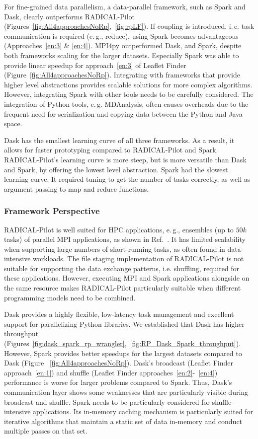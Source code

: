 For fine-grained data parallelism, a data-parallel framework, such as Spark and Dask, clearly outperforms RADICAL-Pilot (Figures~\ref{fig:All4approachesNoRp},~\ref{fig:rpLF}).
If coupling is introduced, i.\,e. task communication is required (e.\,g., reduce), using Spark becomes advantageous (Approaches~\ref{en:3} \& \ref{en:4}). 
MPI4py outperformed Dask, and Spark, despite both frameworks scaling for the larger datasets.
Especially Spark was able to provide linear speedup for approach~\ref{en:3} of Leaflet Finder (Figure~\ref{fig:All4approachesNoRp}).
Integrating with frameworks that provide higher level abstractions provides scalable solutions for more complex algorithms.
However, integrating Spark with other tools needs to be carefully considered.
The integration of Python tools, e.\,g. MDAnalysis, often causes overheads due to the frequent need for serialization and copying data between the Python and Java space.

Dask has the smallest learning curve of all three frameworks.
As a result, it allows for faster prototyping compared to RADICAL-Pilot and Spark.
RADICAL-Pilot's learning curve is more steep, but is more versatile than Dask and Spark, by offering the lowest level abstraction. 
Spark had the slowest learning curve.
It required tuning to get the number of tasks correctly, as well as argument passing to map and reduce functions.

\subsubsection*{Framework Perspective}
RADICAL-Pilot is well suited for HPC applications, e.\,g., ensembles (up to $50k$ tasks) of parallel MPI applications, as shown in Ref.~\cite{merzky2018design,merzky2019using}.
It has limited scalability when supporting large numbers of short-running tasks, as often found in data-intensive workloads.
The file staging implementation of RADICAL-Pilot is not suitable for supporting the data exchange patterns, i.e. shuffling, required for these applications.
However, executing MPI and Spark applications alongside on the same resource makes RADICAL-Pilot particularly suitable when different programming models need to be combined.

Dask provides a highly flexible, low-latency task management and excellent support for parallelizing Python libraries.
We established that Dask has higher throughput (Figures~\ref{fig:dask_spark_rp_wrangler},~\ref{fig:RP_Dask_Spark_throughput}).
However, Spark provides better speedups for the largest datasets compared to Dask (Figure ~\ref{fig:All4approachesNoRp}).
Dask's broadcast (Leaflet Finder approach~\ref{en:1}) and shuffle (Leaflet Finder approaches~\ref{en:2}-~\ref{en:4}) performance is worse for larger problems compared to Spark.
Thus, Dask's communication layer shows some weaknesses that are particularly visible during broadcast and shuffle.
Spark needs to be particularly considered for shuffle-intensive applications.
Its in-memory caching mechanism is particularly suited for iterative algorithms that maintain a static set of data in-memory and conduct multiple passes on that set.


